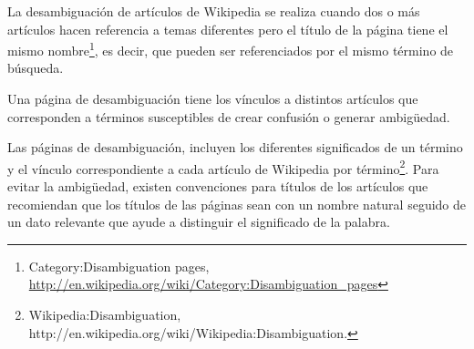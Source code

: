 \documentclass[letterpaper]{article}
\begin{document}
\bigskip

{\sffamily
La desambiguaci\'on de art\'iculos de Wikipedia se realiza cuando dos o
m\'as art\'iculos hacen referencia a temas diferentes pero el t\'itulo
de la p\'agina tiene el mismo
nombre\footnote{\foreignlanguage{spanish}{\textrm{Category:Disambiguation
pages,
}}\url{http://en.wikipedia.org/wiki/Category:Disambiguation_pages}}, es
decir, que pueden ser referenciados p\foreignlanguage{spanish}{or el
mismo t\'ermino de b\'usqueda.}}


\bigskip

{\sffamily
Una p\'agina de desambiguaci\'on tiene los v\'inculos a distintos
art\'iculos que corresponden a t\'erminos susceptibles de crear
confusi\'on o generar ambig\"uedad.}


\bigskip

{\sffamily
Las p\'aginas de desambiguaci\'on, incluyen los diferentes significados
de un t\'ermino y el v\'inculo correspondiente a cada art\'iculo de
Wikipedia por t\'ermino\footnote{Wikipedia:Disambiguation,
http://en.wikipedia.org/wiki/Wikipedia:Disambiguation.}. Para evitar la
ambig\"uedad, existen convenciones para t\'itulos de los art\'iculos
que recomiendan que los t\'itulos de las p\'aginas sean con un nombre
natural seguido de un dato relevante que ayude a distinguir el
significado de la palabra.}


\bigskip
\end{document}
